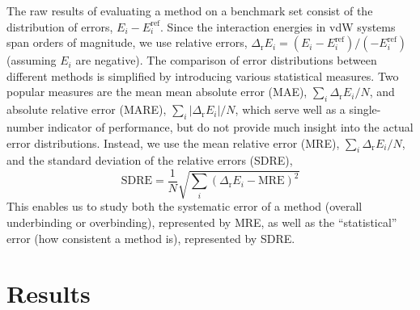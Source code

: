 The raw results of evaluating a method on a benchmark set consist of the distribution of errors, $E_i-E_i^\text{ref}$.
Since the interaction energies in vdW systems span orders of magnitude, we use relative errors, $\Delta_\mathrm rE_i=(E_i-E_i^\text{ref})/(-E_i^\text{ref})$ (assuming $E_i$ are negative).
The comparison of error distributions between different methods is simplified by introducing various statistical measures.
Two popular measures are the mean mean absolute error (MAE), $\sum_i\Delta_\mathrm rE_i/N$, and absolute relative error (MARE), $\sum_i\lvert\Delta_\mathrm rE_i\rvert/N$, which serve well as a single-number indicator of performance, but do not provide much insight into the actual error distributions.
Instead, we use the mean relative error (MRE), $\sum_i\Delta_\mathrm rE_i/N$, and the standard deviation of the relative errors (SDRE),
\[ \text{SDRE}=\frac1N\sqrt{\sum_i(\Delta_\mathrm rE_i-\text{MRE})^2} \]
This enables us to study both the systematic error of a method (overall underbinding or overbinding), represented by MRE, as well as the ``statistical'' error (how consistent a method is), represented by SDRE\@.

\section{Results}

